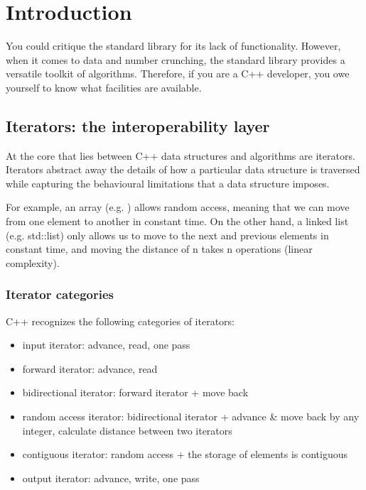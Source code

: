 \chapter{Introduction}

You could critique the \CC standard library for its lack of functionality. However, when it comes to data and number crunching, the \CC standard library provides a versatile toolkit of algorithms. Therefore, if you are a C++ developer, you owe yourself to know what facilities are available.

\section{Iterators: the interoperability layer}

At the core that lies between C++ data structures and algorithms are iterators. Iterators abstract away the details of how a particular data structure is traversed while capturing the behavioural limitations that a data structure imposes.

For example, an array (e.g. \emph{}) allows random access, meaning that we can move from one element to another in constant time. On the other hand, a linked list (e.g. std::list) only allows us to move to the next and previous elements in constant time, and moving the distance of n takes n operations (linear complexity).

\subsection{Iterator categories}

C++ recognizes the following categories of iterators:

\begin{itemize}
    \item \gls{input iterator}: advance, read, one pass
    \item \gls{forward iterator}: advance, read
    \item \gls{bidirectional iterator}: forward iterator + move back
    \item \gls{random access iterator}: bidirectional iterator + advance \& move back by any integer, calculate distance between two iterators
    \item \gls{contiguous iterator}: random access + the storage of elements is contiguous
    \item \gls{output iterator}: advance, write, one pass
\end{itemize}

